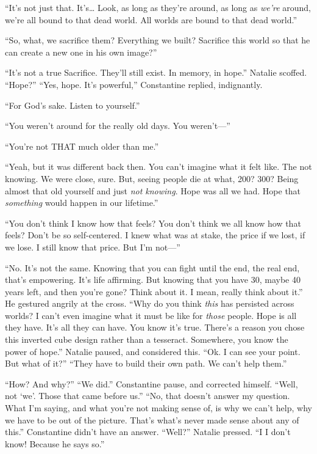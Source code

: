 “It’s not just that. It’s… Look, as long as they’re around, as long as \emph{we’re} around, we’re all bound to that dead world. All worlds are bound to that dead world.”

“So, what, we sacrifice them? Everything we built? Sacrifice this world so that he can create a new one in his own image?”

“It’s not a true Sacrifice. They’ll still exist. In memory, in hope.”
\SmallVSpace
Natalie scoffed. “Hope?”
\SmallVSpace
“Yes, hope. It’s powerful,” Constantine replied, indignantly.

“For God’s sake. Listen to yourself.”

“You weren’t around for the really old days. You weren’t\mbox{---}”

“You’re not THAT much older than me.”

“Yeah, but it was different back then. You can’t imagine what it felt like. The not knowing. We were close, sure. But, seeing people die at what, 200? 300? Being almost that old yourself and just \emph{not knowing}. Hope was all we had. Hope that \emph{something} would happen in our lifetime.”

“You don’t think I know how that feels? You don’t think we all know how that feels? Don’t be so self-centered. I knew what was at stake, the price if we lost, if we lose. I still know that price. But I’m not\mbox{---}”

“No. It’s not the same. Knowing that you can fight until the end, the real end, that’s empowering. It’s life affirming. But knowing that you have 30, maybe 40 years left, and then you’re gone? Think about it. I mean, really think about it.” He gestured angrily at the cross. “Why do you think \emph{this} has persisted across worlds? I can’t even imagine what it must be like for \emph{those} people. Hope is all they have. It’s all they can have. You know it’s true. There’s a reason you chose this inverted cube design rather than a tesseract. Somewhere, you know the power of hope.”
\SomeVSpace
Natalie paused, and considered this. “Ok. I can see your point. But what of it?”
\SomeVSpace
“They have to build their own path. We can’t help them.”

“How? And why?”
\SmallVSpace
“We did.” Constantine pause, and corrected himself. “Well, not ‘we’. Those that came before us.”
\SmallVSpace
“No, that doesn’t answer my question. What I’m saying, and what you’re not making sense of, is why we can’t help, why we have to be out of the picture. That’s what’s never made sense about any of this.”
\SmallVSpace
Constantine didn’t have an answer. “Well?” Natalie pressed.
\SmallVSpace
“I{\el} I don’t know! Because he says so.”

